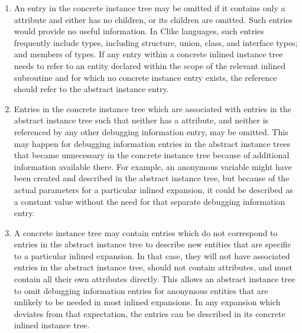 \begin{enumerate}[1.]
\item An entry in the concrete instance tree may be omitted if
it contains only a 
 attribute and either
has no children, or its children are omitted. Such entries
would provide no useful information. In C\dash like languages,
such entries frequently include types, including structure,
union, class, and interface types; and members of types. If any
entry within a concrete inlined instance tree needs to refer
to an entity declared within the scope of the relevant inlined
subroutine and for which no concrete instance entry exists,
the reference should refer to the abstract instance entry.

\item Entries in the concrete instance tree which are associated
with entries in the abstract instance tree such that neither
has a  attribute,
and neither is referenced by
any other debugging information entry, may be omitted. This
may happen for debugging information entries in the abstract
instance trees that became unnecessary in the concrete instance
tree because of additional information available there. For
example, an anonymous variable might have been created and
described in the abstract instance tree, but because of
the actual parameters for a particular inlined expansion,
it could be described as a constant value without the need
for that separate debugging information entry.

\item A concrete instance tree may contain entries which do
not correspond to entries in the abstract instance tree
to describe new entities that are specific to a particular
inlined expansion. In that case, they will not have associated
entries in the abstract instance tree, should not contain
 attributes, and must contain all their
own attributes directly. This allows an abstract instance tree
to omit debugging information entries for anonymous entities
that are unlikely to be needed in most inlined expansions. In
any expansion which deviates from that expectation, the
entries can be described in its concrete inlined instance tree.

\end{enumerate}

